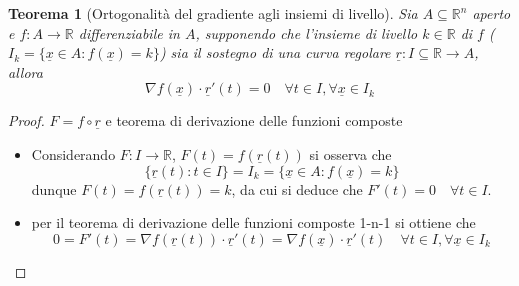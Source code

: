 \documentclass[12pt, a4paper]{article}
\theoremstyle{break}
\newtheorem{theorem}{Teorema} %
\begin{document}
\newpage
\begin{theorem} [Ortogonalità del gradiente agli insiemi di livello]
	Sia $A \subseteq \mathbb{R}^n$ aperto e $f: A \to \mathbb{R}$
	differenziabile in $A$, supponendo che l'insieme di livello $k \in
		\mathbb{R}$ di $f$ ($I_k = \{\underline{x} \in A: f(\underline{x}) = k
		\}$) sia il sostegno di una curva regolare $\underline{r}: I \subseteq
		\mathbb{R} \to A$, allora
	\[
		\nabla f(\underline{x}) \cdot \underline{r}'(t) = 0 \quad \forall t \in
		I , \forall \underline{x} \in I_k
	\]
\end{theorem}
\begin{proof} $F = f \circ \underline{r}$ e teorema di derivazione
	delle funzioni composte
	\begin{itemize}
		\item Considerando $F:I \to \mathbb{R}$, $F(t) = f(\underline{r}(t))$
			si osserva che
			\[
				\{\underline{r}(t): t \in I\} = I_k = \{\underline{x} \in A:
				f(\underline{x}) = k \}
			\]
			dunque $F(t) = f(\underline{r}(t)) = k$, da cui si deduce che
			$F'(t) = 0 \quad \forall t \in I$.
		\item per il teorema di derivazione delle funzioni composte 1-n-1 si
			ottiene che
			\[
				0 = F'(t) = \nabla f(\underline{r}(t)) \cdot \underline{r}'(t) =
				\nabla f(\underline{x}) \cdot \underline{r}'(t) \quad \forall t
				\in I , \forall \underline{x} \in I_k
			\]
	\end{itemize}
\end{proof}
\end{document}
